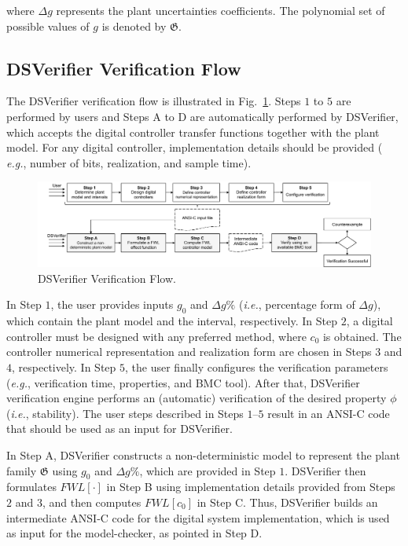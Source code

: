 \documentclass{sig-alternate-05-2015}
\begin{document}
\vspace{1 mm} 
\noindent where $\Delta{g}$ represents the plant uncertainties coefficients. The polynomial set of possible values of $g$ is denoted by $\mathfrak{G}$.

\subsection{DSVerifier Verification Flow}
\label{verification-flow}

The DSVerifier verification flow is illustrated in
Fig.~\ref{DSVerifier_process}.  Steps $1$ to $5$ are performed by users and
Steps A to D are automatically performed by DSVerifier, which accepts the
digital controller transfer functions together with the plant model.  For
any digital controller, implementation details should be provided ({\it
e.g.}, number of bits, realization, and sample time).

\begin{figure}[t]
\centering
\includegraphics[width=\textwidth]{figures/verification-flow.pdf}
\caption{DSVerifier Verification Flow.}
\label{DSVerifier_process}
\end{figure}

In Step $1$, the user provides inputs $g_0$ and $\Delta{g}\%$ ({\it i.e.},
percentage form of $\Delta{g}$), which contain the plant model and the
interval, respectively.  In Step $2$, a digital controller must be designed
with any preferred method, where $c_0$ is obtained.  The controller
numerical representation and realization form are chosen in Steps $3$ and
$4$, respectively.  In Step $5$, the user finally configures the
verification parameters ({\it e.g.}, verification time, properties, and BMC
tool).  After that, DSVerifier verification engine performs an (automatic)
verification of the desired property $\phi$ ({\it i.e.}, stability).  The
user steps described in Steps $1$--$5$ result in an ANSI-C code that should
be used as an input for DSVerifier.

In Step A, DSVerifier constructs a non-deterministic model to represent the
plant family $\mathfrak{G}$ using $g_0$ and $\Delta{g}\%$, which are
provided in Step $1$.  DSVerifier then formulates $\mathit{FWL}[\cdot]$ in
Step B using implementation details provided from Steps $2$ and $3$, and
then computes $\mathit{FWL}[c_0]$ in Step C.  Thus, DSVerifier builds an
intermediate ANSI-C code for the digital system implementation, which is
used as input for the model-checker, as pointed in Step D.
\end{document}
